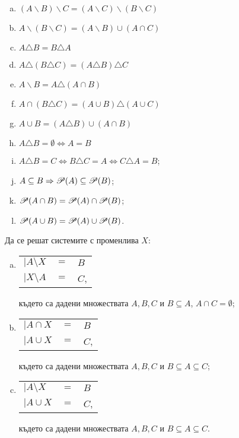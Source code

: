 \begin{problem}
\begin{enumerate}[a)]
  \item
    $(A\backslash B)\backslash C = (A\backslash C)\backslash(B \backslash C)$
  \item
    $A\backslash (B\backslash C) = (A\backslash B) \cup (A\cap C)$
  \item
    $A\triangle B = B\triangle A$
  \item
    $A\triangle(B\triangle C) = (A\triangle B)\triangle C$
  \item
    $A\backslash B = A\triangle(A\cap B)$
  \item
    $A\cap(B\triangle C) = (A\cup B)\triangle(A\cup C)$
  \item
    $A\cup B = (A\triangle B)\cup(A\cap B)$
  \item
    $A\triangle B = \emptyset \iff A = B$
  \item
    $A\triangle B = C \iff B\triangle C = A \iff C\triangle A = B$;
  \item 
    $A\subseteq B \Rightarrow \mathscr{P}(A) \subseteq \mathscr{P}(B)$;
  \item
    $\mathscr{P}(A\cap B) = \mathscr{P}(A) \cap \mathscr{P}(B)$;
  \item
    $\mathscr{P}(A\cup B) = \mathscr{P}(A) \cup \mathscr{P}(B)$.
  \end{enumerate}
\end{problem}

\begin{problem}
  Да се решат системите с променлива $X$:
  \begin{enumerate}[a)]
  \item
    \begin{tabular}{l c l}
      $\big|A\setminus X$ & $= $ & $ B$\\
      $\big|X\setminus A $ & $=$ & $ C$,
    \end{tabular}
    
    където са дадени множествата $A,B,C$ и $B\subseteq A$, $A\cap C = \emptyset$;
  \item
    \begin{tabular}{l c l}
      $\big|A\cap X$ & $= $ & $ B$\\
      $\big|A\cup X $ & $=$ & $ C$,
    \end{tabular}
    
    където са дадени множествата $A,B,C$ и $B\subseteq A\subseteq C$;
  \item
    \begin{tabular}{l c l}
      $\big|A\setminus X$ & $= $ & $ B$\\
      $\big|A\cup X $ & $=$ & $ C$,
    \end{tabular}

    където са дадени множествата $A,B,C$ и $B\subseteq A\subseteq C$.
  \end{enumerate}
\end{problem}


